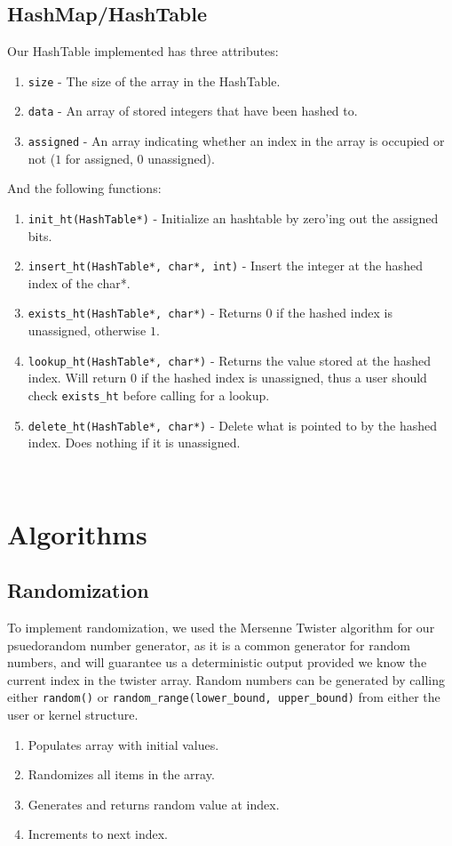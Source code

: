 \documentclass[12pt]{article}
\begin{document}
\subsection{HashMap/HashTable}
Our HashTable implemented has three attributes:
\begin{enumerate}
  \item \texttt{size} - The size of the array in the HashTable.
  \item \texttt{data} - An array of stored integers that have been hashed to.
  \item \texttt{assigned} - An array indicating whether an index in the array is occupied or not ($1$ for assigned, $0$ unassigned).
\end{enumerate}
And the following functions:
\begin{enumerate}
  \item \texttt{init_ht(HashTable*)} - Initialize an hashtable by zero'ing out the assigned bits.
  \item \texttt{insert_ht(HashTable*, char*, int)} - Insert the integer at the hashed index of the char*.
  \item \texttt{exists_ht(HashTable*, char*)} - Returns $0$ if the hashed index is unassigned, otherwise $1$.
  \item \texttt{lookup_ht(HashTable*, char*)} - Returns the value stored at the hashed index.  Will return $0$ if the hashed index is unassigned, thus a user should check \texttt{exists_ht} before calling for a lookup.
  \item \texttt{delete_ht(HashTable*, char*)} - Delete what is pointed to by the hashed index.  Does nothing if it is unassigned.
\end{enumerate}
\\[1\baselineskip]

\section{Algorithms}
\subsection{Randomization}
To implement randomization, we used the Mersenne Twister algorithm for our psuedorandom number generator, as it is a common generator for random numbers, and will guarantee us a deterministic output provided we know the current index in the twister array.  Random numbers can be generated by calling either \texttt{random()} or \texttt{random_range(lower_bound, upper_bound)} from either the user or kernel structure.
\begin{enumerate}
  \item Populates array with initial values.
  \item Randomizes all items in the array.
  \item Generates and returns random value at index.
  \item Increments to next index.
\end{enumerate}
\\[1\baselineskip]
\end{document}
